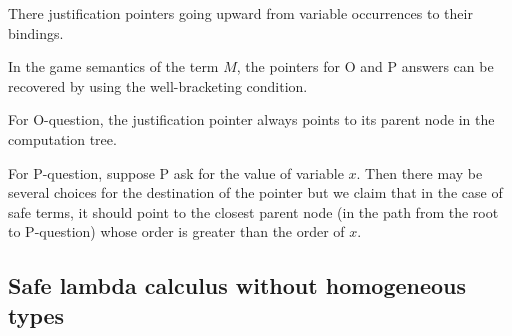 There justification pointers going upward from variable occurrences
to their bindings.

In the game semantics of the term $M$, the pointers for O and P
answers can be recovered by using the well-bracketing condition.

For O-question, the justification pointer always points to its
parent node in the computation tree.

For P-question, suppose P ask for the value of variable $x$. Then
there may be several choices for the destination of the pointer but
we claim that in the case of safe terms, it should point to the
closest parent node (in the path from the root to P-question) whose
order is greater than the order of $x$.

\subsection{Safe lambda calculus without homogeneous types}

